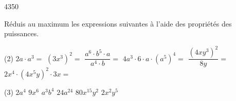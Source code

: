 \documentclass[parskip=half-,twoside=semi, 12pt]{scrartcl}
\begin{document}
\begin{soltransferer}
    \num{4350}
\end{soltransferer}
\begin{appliquer}[points=6]
    Réduis au maximum les expressions suivantes à l'aide des propriétés des puissances.
    \begin{tasks}[after-item-skip=2cm](2)
        \task \(2a \cdot a^{3} =\)
        \task \(\left( 3x^{3} \right)^{2} =\)
        \task \(\dfrac{a^{6} \cdot b^{5} \cdot a}{a^{4} \cdot b} =\)
        \task \(4a^{3} \cdot 6 \cdot a \cdot \left( a^{5} \right)^{4} =\)
        \task \(\dfrac{\left( 4xy^{3} \right)^{2}}{8y} =\)
        \task \(2x^{4} \cdot \left( 4x^{5}y \right)^{2} \cdot 3x =\)
    \end{tasks}
    \vspace{2cm}
\end{appliquer}
\begin{solappliquer}
    \begin{tasks}(3)
        \task \(2a^4\)
        \task \(9x^6\)
        \task \(a^3b^4\)
        \task \(24a^{24}\)
        \task \(80x^{15}y^2\)
        \task \(2x^2y^5\)
    \end{tasks}
\end{solappliquer}
\end{document}
